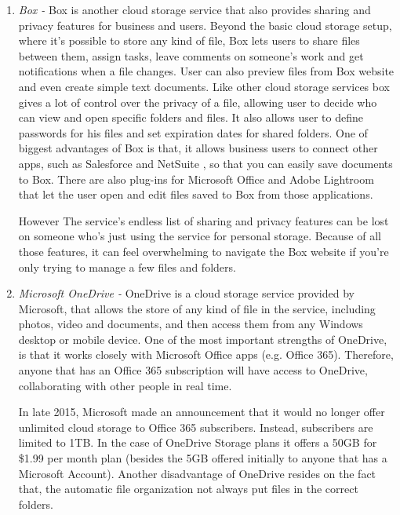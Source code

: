 \begin{enumerate}
\item {\it Box -}
Box is another cloud storage service that also provides sharing and privacy features for business and users. Beyond the basic cloud storage setup, where it's possible to store any kind of file, Box lets users to share files between them, assign tasks, leave comments on someone's work and get notifications when a file changes. User can also preview files from Box website and even create simple text documents. Like other cloud storage services box gives a lot of control over the privacy of a file, allowing user to decide who can view and open specific folders and files. It also allows user to define passwords for his files and set expiration dates for shared folders.
One of biggest advantages of Box is that, it allows business users to connect 
other apps, such as Salesforce and NetSuite \cite{cloud:netSuite}, so that you can easily save documents to Box. There are also plug-ins for Microsoft Office and Adobe Lightroom that let the user open and edit files saved to Box from those applications.

However The service's endless list of sharing and privacy features can be lost on someone who's just using the service for personal storage.
Because of all those features, it can feel overwhelming to navigate the Box website if you're only trying to manage a few files and folders.\\

\item {\it Microsoft OneDrive -}
OneDrive is a cloud storage service provided by Microsoft, that allows the store of any kind of file in the service, including photos, video and documents, and then access them from any Windows desktop or mobile device. One of the most important strengths of OneDrive, is that it works closely with Microsoft Office apps (e.g. Office 365). Therefore, anyone that has an Office 365 subscription will have access to OneDrive, collaborating with other people in real time.

In late 2015, Microsoft made an announcement that it would no longer offer unlimited cloud storage to Office 365 subscribers. Instead, subscribers are limited to 1TB. In the case of OneDrive Storage plans it offers a 50GB for \$1.99 per month plan (besides the 5GB offered initially to anyone that has a Microsoft Account). 
Another disadvantage of OneDrive resides on the fact that, the automatic file organization not always put files in the correct folders.\\


\end{enumerate}
